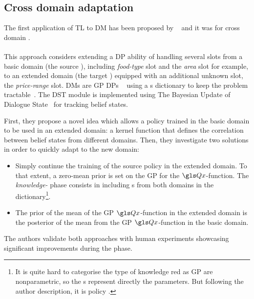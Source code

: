 \subsection{Cross domain adaptation}

The first application of \gls{TL} to \gls{DM} has been proposed by ~\parencite{Gasic2013} and it was for cross domain .

\paragraph{\cite{Gasic2013}} This approach considers extending a \gls{DP} ability of handling several slots from a basic domain (the source ), including \textit{food-type} slot and the \textit{area} slot for example, to an extended domain (the target ) equipped with an additional unknown slot, the \textit{price-range} slot. \glspl{DM} are \gls{GP} \glspl{DP} ~\parencite{Rasmussen2006-gp-for-machine-learning,Gasic2014-gp-pomdp-dialogue} using a s dictionary to keep the problem tractable~\parencite{Engel2006-gp-dictonnary}. The \gls{DST} module is implemented using The Bayesian Update of Dialogue State~\parencite{Thomson2009-BUDS-dialogue} for tracking belief states.

First, they propose a novel idea which allows a policy trained in the basic domain to be used in an extended domain: a kernel function that defines the correlation between belief states from different domains. Then, they investigate two solutions in order to quickly adapt to the new domain:

\begin{itemize}
    \item Simply continue the training of the source policy in the extended domain. To that extent, a zero-mean prior is set on the \gls{GP} for the $\Q$-function. The \textit{knowledge-} phase consists in including s from both domains in the dictionary\footnote{It is quite hard to categorise the type of knowledge red as \gls{GP} are nonparametric, so the s represent directly the parameters. But following the author description, it is policy .}.
    \item The prior of the mean of the \gls{GP} $\Q$-function in the extended domain is the posterior of the mean from the \gls{GP} $\Q$-function in the basic domain.
\end{itemize}

The authors validate both approaches with human experiments showcasing significant improvements during the  phase.

